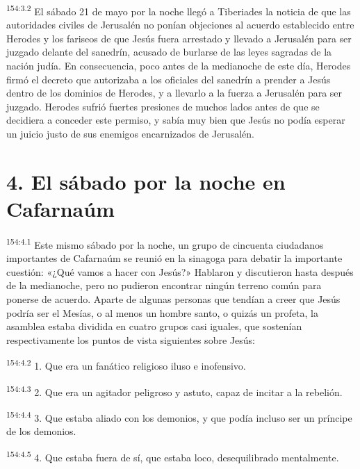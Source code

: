 \par
\textsuperscript{154:3.2} El sábado 21 de mayo por la noche llegó a Tiberiades la noticia de que las autoridades civiles de Jerusalén no ponían objeciones al acuerdo establecido entre Herodes y los fariseos de que Jesús fuera arrestado y llevado a Jerusalén para ser juzgado delante del sanedrín, acusado de burlarse de las leyes sagradas de la nación judía. En consecuencia, poco antes de la medianoche de este día, Herodes firmó el decreto que autorizaba a los oficiales del sanedrín a prender a Jesús dentro de los dominios de Herodes, y a llevarlo a la fuerza a Jerusalén para ser juzgado. Herodes sufrió fuertes presiones de muchos lados antes de que se decidiera a conceder este permiso, y sabía muy bien que Jesús no podía esperar un juicio justo de sus enemigos encarnizados de Jerusalén.

\section*{4. El sábado por la noche en Cafarnaúm}
\par
\textsuperscript{154:4.1} Este mismo sábado por la noche, un grupo de cincuenta ciudadanos importantes de Cafarnaúm se reunió en la sinagoga para debatir la importante cuestión: «¿Qué vamos a hacer con Jesús?» Hablaron y discutieron hasta después de la medianoche, pero no pudieron encontrar ningún terreno común para ponerse de acuerdo. Aparte de algunas personas que tendían a creer que Jesús podría ser el Mesías, o al menos un hombre santo, o quizás un profeta, la asamblea estaba dividida en cuatro grupos casi iguales, que sostenían respectivamente los puntos de vista siguientes sobre Jesús:

\par
\textsuperscript{154:4.2} 1. Que era un fanático religioso iluso e inofensivo.

\par
\textsuperscript{154:4.3} 2. Que era un agitador peligroso y astuto, capaz de incitar a la rebelión.

\par
\textsuperscript{154:4.4} 3. Que estaba aliado con los demonios, y que podía incluso ser un príncipe de los demonios.

\par
\textsuperscript{154:4.5} 4. Que estaba fuera de sí, que estaba loco, desequilibrado mentalmente.


